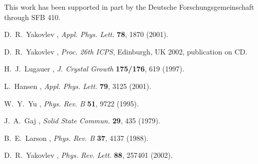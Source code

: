 \documentclass[a4paper,draft]{book}
\begin{document}
\ack
This work has been supported in part by the Deutsche
For\-schungs\-ge\-mein\-schaft through SFB 410.

\begin{thebibliography}{8}
\itemsep-2pt

D.~R.~Yakovlev \etal,
{\em Appl. Phys. Lett.} {\bf 78}, 1870 (2001).

D.~R.~Yakovlev \etal,
{\em Proc. 26th ICPS}, Edinburgh, UK 2002, publication on CD.

H.~J.~Lugauer \etal,
{\em J. Crystal Growth} {\bf 175/176}, 619 (1997).

L.~Hansen \etal,
{\em Appl. Phys. Lett.} {\bf 79}, 3125 (2001).

W.~Y.~Yu \etal,
{\em Phys. Rev. B} {\bf 51}, 9722 (1995).

J.~A.~Gaj \etal,
{\em Solid State Commun.} {\bf 29}, 435 (1979).

B.~E.~Larson \etal,
{\em Phys. Rev. B} {\bf 37}, 4137 (1988).

D.~R.~Yakovlev \etal,
{\em Phys. Rev. Lett.} {\bf 88}, 257401 (2002).

\end{thebibliography}
\end{document}
